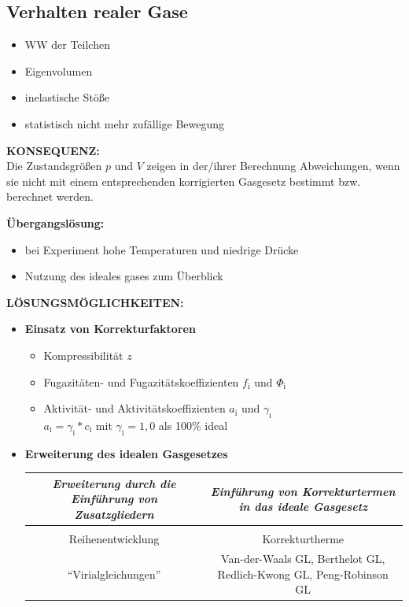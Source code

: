 \subsection{Verhalten realer Gase}

\begin{itemize}
	\item WW der Teilchen
	\item Eigenvolumen
	\item inelastische Stöße
	\item statistisch nicht mehr zufällige Bewegung
\end{itemize}

\textbf{KONSEQUENZ:}\\
Die Zustandsgrößen $p$ und $V$ zeigen in der/ihrer Berechnung Abweichungen, wenn sie nicht mit einem entsprechenden korrigierten Gasgesetz bestimmt bzw. berechnet werden.

\begin{center}
	\textbf{Übergangslösung:}
	\begin{itemize}
		\centering
		\item bei Experiment hohe Temperaturen und niedrige Drücke
		\item Nutzung des ideales gases zum Überblick
	\end{itemize}
\end{center}

\newpage

\textbf{LÖSUNGSMÖGLICHKEITEN:}
\begin{itemize}
	\item \textbf{Einsatz von Korrekturfaktoren}
	\begin{itemize}
		\item Kompressibilität $z$
		\item Fugazitäten- und Fugazitätskoeffizienten $f_{\text{i}}$ und $\Phi_{\text{i}}$
		\item Aktivität- und Aktivitätskoeffizienten $a_{\text{i}}$ und  $\gamma_{\text{i}}$\\
			$a_{\text{i}}=\gamma_{\text{i}}*c_{\text{i}}$ mit $\gamma_{\text{i}}=1,0$ als 100\% ideal
	\end{itemize}
	
	\item \textbf{Erweiterung des idealen Gasgesetzes}
	\renewcommand{\arraystretch}{1.2}
	\begin{table}[h!]
		\centering
		\begin{tabulary}{\textwidth}{C|C}
			\textit{Erweiterung durch die Einführung von Zusatzgliedern} & \textit{Einführung von Korrekturtermen in das ideale Gasgesetz} \\
			\hline
			&\\
			Reihenentwicklung & Korrekturtherme\\
			"`Virialgleichungen"'& Van-der-Waals GL, Berthelot GL, Redlich-Kwong GL, Peng-Robinson GL
		\end{tabulary} 
	\end{table}
	\FloatBarrier
\end{itemize}








